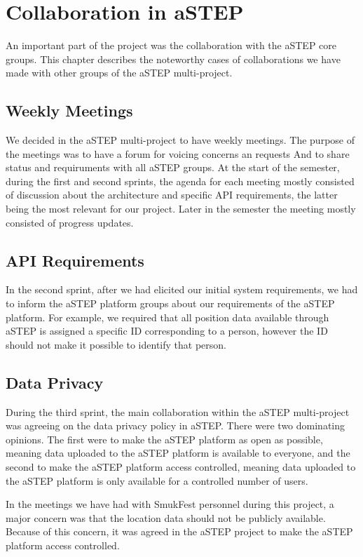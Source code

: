 \chapter{Collaboration in aSTEP}\label{ch:collab}

An important part of the project was the collaboration with the aSTEP core groups. This chapter describes the noteworthy cases of collaborations we have made with other groups of the aSTEP multi-project.

\section{Weekly Meetings}
We decided in the aSTEP multi-project to have weekly meetings. The purpose of the meetings was to have a forum for voicing concerns an requests And to share status and requiruments with all aSTEP groups. At the start of the semester, during the first and second sprints, the agenda for each meeting mostly consisted of discussion about the architecture and specific API requirements, the latter being the most relevant for our project. Later in the semester the meeting mostly consisted of progress updates.

\section{API Requirements}
In the second sprint, after we had elicited our initial system requirements, we had to inform the aSTEP platform groups about our requirements of the aSTEP platform. For example, we required that all position data available through aSTEP is assigned a specific ID corresponding to a person, however the ID should not make it possible to identify that person.

\section{Data Privacy}
During the third sprint, the main collaboration within the aSTEP multi-project was agreeing on the data privacy policy in aSTEP. There were two dominating opinions. The first were to make the aSTEP platform as open as possible, meaning data uploaded to the aSTEP platform is available to everyone, and the second to make the aSTEP platform access controlled, meaning data uploaded to the aSTEP platform is only available for a controlled number of users.

In the meetings we have had with SmukFest personnel during this project, a major concern was that the location data should not be publicly available. Because of this concern, it was agreed in the aSTEP project to make the aSTEP platform access controlled.

